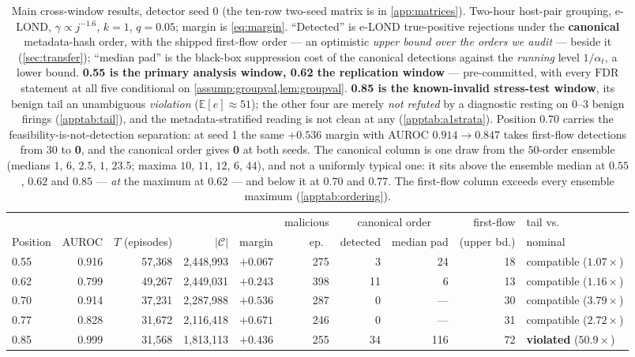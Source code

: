 \documentclass[conference]{IEEEtran}
\newcommand{\Cal}{\mathcal{C}}
\newcommand{\nCal}{\lvert\Cal\rvert}
\newcommand{\alphat}{\alpha_t}
\newcommand{\FDR}{\mathrm{FDR}}
\begin{document}
\begin{table}[t]
\centering
\caption{Main cross-window results, detector seed 0 (the ten-row two-seed matrix is in
\cref{app:matrices}). Two-hour host-pair grouping, e-LOND, $\gamma \propto j^{-1.6}$, $k=1$,
$q = 0.05$; margin is \cref{eq:margin}. ``Detected'' is e-LOND true-positive rejections under the
\textbf{canonical} metadata-hash order, with the shipped first-flow order --- an optimistic
\emph{upper bound over the orders we audit} --- beside it (\cref{sec:transfer}); ``median pad'' is the black-box suppression
cost of the canonical detections against the \emph{running} level $1/\alphat$, a lower bound.
\textbf{0.55 is the primary analysis window, 0.62 the replication window} --- pre-committed, with every
$\FDR$ statement at all five conditional on \cref{assump:groupval,lem:groupval}.
\textbf{0.85 is the known-invalid stress-test window}, its benign tail an unambiguous \emph{violation}
($\mathbb{E}[e]\approx51$); the other four are merely \emph{not refuted} by a diagnostic resting on
$0$--$3$ benign firings (\cref{apptab:tail}), and the metadata-stratified reading is not clean at any
(\cref{apptab:a1strata}).
Position 0.70 carries the feasibility-is-not-detection separation: at seed 1 the same $+0.536$ margin
with AUROC $0.914 \to 0.847$ takes first-flow detections from 30 to \textbf{0}, and the canonical
order gives \textbf{0} at both seeds. The canonical column is one draw from the $50$-order ensemble
(medians $1$, $6$, $2.5$, $1$, $23.5$; maxima $10$, $11$, $12$, $6$, $44$), and not a uniformly
typical one: it sits above the ensemble median at $0.55$, $0.62$ and $0.85$ --- \emph{at} the maximum
at $0.62$ --- and below it at $0.70$ and $0.77$. The first-flow column exceeds every ensemble maximum
(\cref{apptab:ordering}).}
\label{tab:main}
\begin{tabular}{lrrrrrrrrl}
\toprule
 &  &  &  &  & malicious & \multicolumn{2}{c}{canonical order} & first-flow & tail vs.\ \\
Position & AUROC & $T$ (episodes) & $\nCal$ & margin & ep.\ & detected & median pad & (upper bd.) & nominal \\
\midrule
0.55 & 0.916  & 57{,}368 & 2{,}448{,}993 & $+0.067$ & 275 & 3  & 24    & 18 & compatible ($1.07\times$) \\
0.62 & 0.799  & 49{,}267 & 2{,}449{,}031 & $+0.243$ & 398 & 11 & 6     & 13 & compatible ($1.16\times$) \\
0.70 & 0.914  & 37{,}231 & 2{,}287{,}988 & $+0.536$ & 287 & 0  & ---   & 30 & compatible ($3.79\times$) \\
0.77 & 0.828  & 31{,}672 & 2{,}116{,}418 & $+0.671$ & 246 & 0  & ---   & 31 & compatible ($2.72\times$) \\
0.85 & 0.999  & 31{,}568 & 1{,}813{,}113 & $+0.436$ & 255 & 34 & 116   & 72 & \textbf{violated} ($50.9\times$) \\
\bottomrule
\end{tabular}
\end{table}
\end{document}
